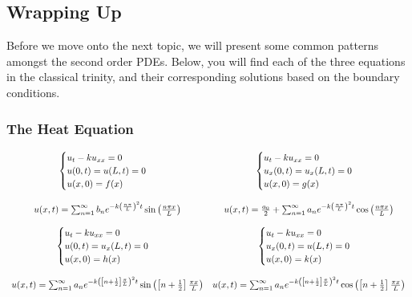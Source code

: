 \documentclass{article}
\begin{document}
\newpage
\subsection{Wrapping Up}
\indent Before we move onto the next topic, we will present some common patterns amongst the second order PDEs. Below, you will find each of the three equations in the classical trinity, and their corresponding solutions based on the boundary conditions.
\subsubsection{The Heat Equation}
\[
\begin{array}{c c}
\begin{cases}
u_{t} - ku_{xx} = 0\\
u(0,t) = u(L,t) = 0\\
u(x,0) = f(x)
\end{cases}
&
\begin{cases}
u_{t} - ku_{xx} = 0\\
u_{x}(0,t) = u_{x}(L,t) = 0\\
u(x,0) = g(x)
\end{cases}\\
&\\
u(x,t) = \sum_{n=1}^{\infty}b_{n}e^{-k\left(\frac{n\pi}{L}\right)^{2}t}\sin{\left(\frac{n\pi x}{L}\right)}
& u(x,t) = \frac{a_{0}}{2} + \sum_{n=1}^{\infty}a_{n}e^{-k\left(\frac{n\pi}{L}\right)^{2}t}\cos{\left(\frac{n\pi x}{L}\right)}\\
&\\
\begin{cases}
u_{t} - ku_{xx} = 0\\
u(0,t) = u_{x}(L,t) = 0\\
u(x,0) = h(x)
\end{cases}
&
\begin{cases}
u_{t} - ku_{xx} = 0\\
u_{x}(0,t) = u(L,t) = 0\\
u(x,0) = k(x)
\end{cases}\\
&\\
u(x,t) =  \sum_{n=1}^{\infty}a_{n}e^{-k\left(\left[n + \frac{1}{2}\right]\frac{\pi}{L}\right)^{2}t}\sin{\left(\left[n + \frac{1}{2}\right]\frac{\pi x}{L}\right)}
& u(x,t) =  \sum_{n=1}^{\infty}a_{n}e^{-k\left(\left[n + \frac{1}{2}\right]\frac{\pi}{L}\right)^{2}t}\cos{\left(\left[n + \frac{1}{2}\right]\frac{\pi x}{L}\right)}
\end{array}
\]
\noindent\\
\end{document}

